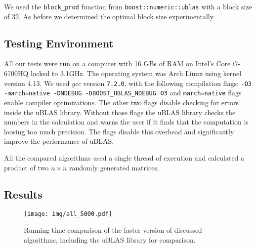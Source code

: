 \documentclass[a4paper,11pt]{article}
\begin{document}
We used the \texttt{block\_prod} function from \texttt{boost::numeric::ublas} with a block size of $32$. As before we determined the optimal block size experimentally.


\subsection{Testing Environment}
All our tests were run on a computer with 16 GBs of RAM on Intel's Core i7-6700HQ locked to 3.1GHz. The operating system was Arch Linux using kernel version 4.13. We used \textit{gcc} version \texttt{7.2.0}, with the following compilation flags: \texttt{-O3 -march=native -DNDEBUG -DBOOST\_UBLAS\_NDEBUG}. \texttt{O3} and \texttt{march=native} flags enable compiler optimizations. The other two flags disable checking for errors inside the uBLAS library. Without those flags the uBLAS library checks the numbers in the calculation and warns the user if it finds that the computation is loosing too much precision. The flags disable this overhead and significantly improve the performance of uBLAS. 

 All the compared algorithms used a single thread of execution and calculated a product of two $n \times n$ randomly generated matrices. 


\subsection{Results}

\begin{figure}[h]
\centering
\texttt{[image: img/all\_5000.pdf]}
\caption{Running-time comparison of the faster version of discussed algorithms, including the uBLAS library for comparison.}
\label{fig:all_algorithms}
\end{figure}
\end{document}
